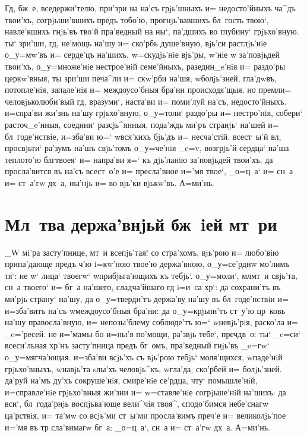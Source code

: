 \documentclass[12pt,twoside,xdvi,a6paper,civil=times]{hipbook}
\renewcommand{\*}{\raise3pt\hbox{\footnotesize*}}
\begin{document}
Гд, бж~е, вседержи'телю, при'зри на на'съ грjь'шныхъ и= недосто'йныхъ
ча^дъ тво\-и'хъ, согрjьши'вшихъ предъ тобо'ю, про\-гнjь'\-вав\-шихъ бл~гость твою`,
навле'кшихъ гнjь'въ тво'й пра'ведный на ны`, па'дшихъ во глу\-би\-ну` грjьхо'вную.
ты` зри'ши, гд, не'\-мощь на'шу и= ско'рбь душе'вную, вjь'си рас\-тлjь'\-нiе
о_у=мw'въ и= серде'цъ на'шихъ, w=скудjь'нiе вjь'ры, w'нiе w\т
за'повjьдей твои'хъ, о_у=\-мно\-же'\-нiе нестрое'нiй семе'йныхъ, раз\ъ\-е\-ди\-н_e'\-нiя и=
раздо'ры церкw'вныя, ты зри'\-ши пе\-ча^\-ли и= скw'рби на'шя, w\т болjь'зней,
гла'\-дwвъ, потопле'нiя, запале'нiя и= меж\-до\-у\-со'б\-ныя бра'ни происходя'щыя. но
премл и= человjьколюби'вый гд, вразуми`, наста'ви и= поми'луй на'съ,
недосто'йныхъ. и=спра'ви жи'знь на'шу грjьхо'вную, о_у=толи` раздо'ры и=
не\-стро'\-нiя, собери` расточ_e'нныя, соедини` раз\-сjь^\-ян\-ныя, пода'ждь ми'ръ
странjь` на'шей и= бл~годе'нствiе, и=зба'ви ю=` w\т вся'кихъ бjь'дъ и=
несча'стiй. всест~ы'й вл, просвjьти` ра'зумъ на'шъ свjь'томъ о_у=че'нiя
_e=v, возгрjь'й сердца` на'ша теплото'ю блг твоея` и= напра'ви
я=` къ дjь'ланiю за'повjьдей твои'хъ, да просла'вится въ на'съ всест~о'е и=
пресла'вное и='мя твое`, _о=ц~а` и= сн~а и= ст~а'гw дх~а, ны'нjь и= во вjь'ки
вjькw'въ. А=ми'нь.

\section{\cs Мл~тва держа'внjьй бж~iей мт~ри}

_W мi'ра засту'пнице, мт~и всепjь'тая! со стра'хомъ, вjь'рою и= любо'вiю
припа'дающе предъ ч'ю i=кw'ною твое'ю держа'вною, о_у=\-се'рд\-нw мо'лимъ
тя`: не w` лица` твоегw` w\т прибjьга'ющихъ къ тебjь`. о_у=моли`,
мл мт~и свjь'та, сн~а твоего` и= бг~а на'\-ше\-го, сладча'йшаго гд
i=и~са хр`: да со\-хра\-ни'тъ въ ми'рjь страну` на'шу, да о_у=\-твер\-ди'тъ
держа'ву на'шу въ бл~годе'нствiи и= и=зба'витъ на'съ w\т междоусо'бныя бра'ни:
да о_у=крjьпи'тъ ст~у'ю цр~ковь на'шу пра\-во\-сла'в\-ную, и= непозы'блему
соблюде'тъ ю=` w\т не\-вjь'\-рiя, раско'ла и= _e='ресей. не и='мамы бо и=ны'я
по'мощи, ра'звjь тебе`, преч дв~о: ты` _e=си` всеси'льная хр'нъ
засту'пница предъ бг~омъ, пра'ведный гнjь'въ _e=гw` о_у=мягча'ющая. и=зба'ви
всjь'хъ съ вjь'рою тебjь` моля'щихся, w\т паде'нiй грjьхо'вныхъ, w\т навjь'та
sлы'хъ человjь^къ, w\т гла'да, ско'рбей и= болjь'зней. да'руй на'мъ ду'хъ
сокруше'нiя, смире'нiе се'рдца, ч\-ту` помышле'нiй, и=справле'нiе
грjьхо'вныя жи'зни и= w=ставле'нiе согрjьше'нiй на'шихъ: да вси`, бл~года'рнjь
воспjьва'юще вели^чiя твоя^, сподо'бимся небе'снагw ца'рствiя, и= та'мw со
всjь'ми ст~ы'ми просла'вимъ преч'е и= великолjь'пое и='мя въ тр
сла'вимагw бг~а: _о=ц~а`, сн~а и= ст~а'гw дх~а. А=ми'нь.
\end{document}
